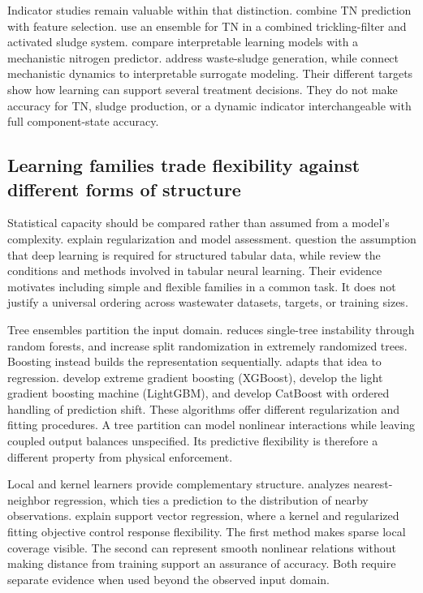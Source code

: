 Indicator studies remain valuable within that distinction. \citet{Bagherzadeh2021} combine TN prediction with feature selection. \citet{SadriMoghaddamMesghali2023} use an ensemble for TN in a combined trickling-filter and activated sludge system. \citet{Wang2025} compare interpretable learning models with a mechanistic nitrogen predictor. \citet{Yang2025} address waste-sludge generation, while \citet{Xiao2026} connect mechanistic dynamics to interpretable surrogate modeling. Their different targets show how learning can support several treatment decisions. They do not make accuracy for TN, sludge production, or a dynamic indicator interchangeable with full component-state accuracy.

\subsection{Learning families trade flexibility against different forms of structure}

Statistical capacity should be compared rather than assumed from a model's complexity. \citet{Hastie2009} explain regularization and model assessment. \citet{ShwartzZiv2022} question the assumption that deep learning is required for structured tabular data, while \citet{Borisov2024} review the conditions and methods involved in tabular neural learning. Their evidence motivates including simple and flexible families in a common task. It does not justify a universal ordering across wastewater datasets, targets, or training sizes.

Tree ensembles partition the input domain. \citet{Breiman2001} reduces single-tree instability through random forests, and \citet{Geurts2006} increase split randomization in extremely randomized trees. Boosting instead builds the representation sequentially. \citet{Drucker1997} adapts that idea to regression. \citet{ChenGuestrin2016} develop extreme gradient boosting (XGBoost), \citet{Ke2017} develop the light gradient boosting machine (LightGBM), and \citet{Prokhorenkova2018} develop CatBoost with ordered handling of prediction shift. These algorithms offer different regularization and fitting procedures. A tree partition can model nonlinear interactions while leaving coupled output balances unspecified. Its predictive flexibility is therefore a different property from physical enforcement.

Local and kernel learners provide complementary structure. \citet{Mack1981} analyzes nearest-neighbor regression, which ties a prediction to the distribution of nearby observations. \citet{SmolaScholkopf2004} explain support vector regression, where a kernel and regularized fitting objective control response flexibility. The first method makes sparse local coverage visible. The second can represent smooth nonlinear relations without making distance from training support an assurance of accuracy. Both require separate evidence when used beyond the observed input domain.

